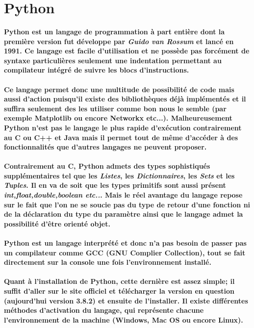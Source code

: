 \documentclass[a4paper, 12pt, twoside]{article}
\begin{document}
\section{Python}
\paragraph{Python est un langage de programmation à part entière dont la première version fut développe par \textit{Guido van Rossum} et lancé en 1991. Ce langage est facile d'utilisation et ne possède pas forcément de syntaxe particulières seulement une indentation   permettant au compilateur intégré de suivre les blocs d'instructions.}
\paragraph{Ce langage permet donc une multitude de possibilité de code mais aussi d'action puisqu'il existe des bibliothèques déjà implémentés et il suffira seulement des les utiliser comme bon nous le semble (par exemple Matplotlib ou encore Networkx etc...). Malheureusement Python n'est pas le langage le plus rapide d'exécution contrairement au C ou C++ et Java mais il permet tout de même d'accéder à des fonctionnalités que d'autres langages ne peuvent proposer.}
\paragraph{Contrairement au C, Python admets des types sophistiqués supplémentaires tel que les \textit{Listes}, les \textit{Dictionnaires}, les \textit{Sets} et les \textit{Tuples}. Il en va de soit que les types primitifs sont aussi présent \textit{int,float,double,boolean etc..}. Mais le réel avantage du langage repose sur le fait que l'on ne se soucie pas du type de retour d'une fonction ni de la déclaration du type du paramètre ainsi que le langage admet la possibilité d'être orienté objet.}
\paragraph{Python est un langage interprété et donc n'a pas besoin de passer pas un compilateur comme GCC (GNU Complier Collection), tout se fait directement sur la console une fois l'environnement installé.}
\paragraph{Quant à l'installation de Python, cette dernière est assez simple; il suffit d'aller sur le site officiel et télécharger la version en question (aujourd'hui version 3.8.2) et ensuite de l'installer. Il existe différentes méthodes d'activation du langage, qui représente chacune l'environnement de la machine (Windows, Mac OS ou encore Linux).}
\end{document}

